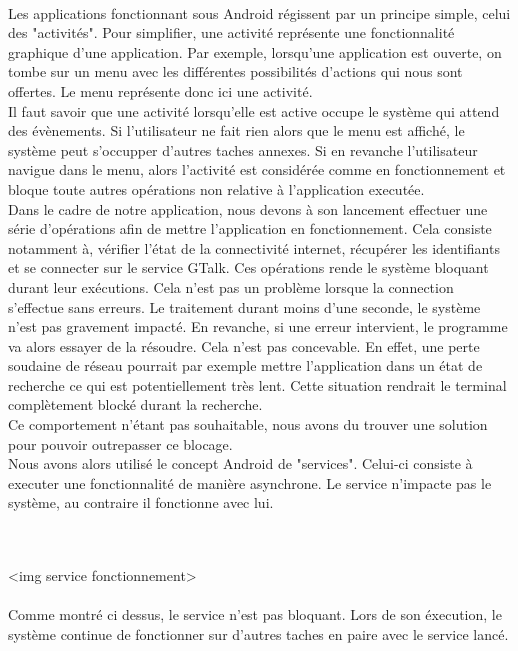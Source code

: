 \paragraph{}
Les applications fonctionnant sous Android régissent par un principe simple, celui des "activités".
Pour simplifier, une activité représente une fonctionnalité graphique d'une application. Par exemple,
lorsqu'une application est ouverte, on tombe sur un menu avec les différentes possibilités d'actions 
qui nous sont offertes. Le menu représente donc ici une activité. 
\\
Il faut savoir que une activité lorsqu'elle est active occupe le système qui attend des évènements.
Si l'utilisateur ne fait rien alors que le menu est affiché, le système peut s'occupper d'autres 
taches annexes. Si en revanche l'utilisateur navigue dans le menu, alors l'activité est considérée
comme en fonctionnement et bloque toute autres opérations non relative à l'application executée.
\\
Dans le cadre de notre application, nous devons à son lancement effectuer une série d'opérations 
afin de mettre l'application en fonctionnement. Cela consiste notamment à, vérifier l'état de la 
connectivité internet, récupérer les identifiants et se connecter sur le service GTalk. Ces 
opérations rende le système bloquant durant leur exécutions. Cela n'est pas un problème lorsque la 
connection s'effectue sans erreurs. Le traitement durant moins d'une seconde, le système n'est pas
gravement impacté. En revanche, si une erreur intervient, le programme va alors essayer de la résoudre.
Cela n'est pas concevable. En effet, une perte soudaine de réseau pourrait par exemple mettre 
l'application dans un état de recherche ce qui est potentiellement très lent. Cette situation rendrait
le terminal complètement blocké durant la recherche. 
\\
Ce comportement n'étant pas souhaitable, nous avons du trouver une solution pour pouvoir outrepasser ce blocage.
\\
Nous avons alors utilisé le concept Android de "services". Celui-ci consiste à executer une fonctionnalité 
de manière asynchrone. Le service n'impacte pas le système, au contraire il fonctionne avec lui. 

\\\\
<img service fonctionnement>
\\\\

Comme montré ci dessus, le service n'est pas bloquant. Lors de son éxecution, le système continue de 
fonctionner sur d'autres taches en paire avec le service lancé.

